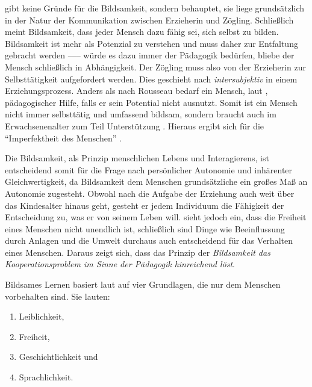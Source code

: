 \citeauthor{benner-2012} gibt keine Gründe für die Bildsamkeit, sondern behauptet, sie liege grundsätzlich in der  Natur der Kommunikation zwischen Erzieherin und Zögling.
Schließlich meint Bildsamkeit, dass jeder Mensch dazu fähig sei, sich selbst zu bilden.
Bildsamkeit ist mehr als Potenzial zu verstehen und muss daher zur Entfaltung gebracht werden ––– würde es dazu immer der Pädagogik bedürfen, bliebe der Mensch schließlich in Abhängigkeit.
Der Zögling muss also von der Erzieherin zur Selbsttätigkeit aufgefordert werden.
Dies geschieht nach \citeauthor{benner-2012} \emph{intersubjektiv} in einem Erziehungsprozess.
Anders als nach Rousseau bedarf ein Mensch, laut \citeauthor{benner-2012}, pädagogischer Hilfe, falls er sein Potential nicht ausnutzt.
Somit ist ein Mensch nicht immer selbsttätig und umfassend bildsam, sondern braucht auch im Erwachsenenalter zum Teil Unterstützung \parencite[vgl.][91]{benner-2012}.
Hieraus ergibt sich für \citeauthor{benner-2012} die ``Imperfektheit des Menschen'' \citeyear[vgl.][78]{benner-2012}.

Die Bildsamkeit, als Prinzip menschlichen Lebens und Interagierens, ist entscheidend somit für die Frage nach persönlicher Autonomie und inhärenter Gleichwertigkeit, da Bildsamkeit dem Menschen grundsätzliche ein großes Maß an Autonomie zugesteht.
Obwohl nach \citeauthor{benner-2012} die Aufgabe der Erziehung auch weit über das Kindesalter hinaus geht, gesteht er jedem Individuum die Fähigkeit der Entscheidung zu, was er von seinem Leben will.
\citeauthor{benner-2012} sieht jedoch ein, dass die Freiheit eines Menschen nicht unendlich ist, schließlich sind Dinge wie Beeinflussung durch Anlagen und die Umwelt durchaus auch entscheidend für das Verhalten eines Menschen.
Daraus zeigt sich, dass das Prinzip der \emph{Bildsamkeit das Kooperationsproblem im Sinne der Pädagogik hinreichend löst}.

Bildsames Lernen basiert laut \citeauthor{benner-2012} auf vier Grundlagen, die nur dem Menschen vorbehalten sind.
Sie lauten:

\begin{enumerate}
	\item Leiblichkeit,
	\item Freiheit,
	\item Geschichtlichkeit und
	\item Sprachlichkeit.
\end{enumerate}

